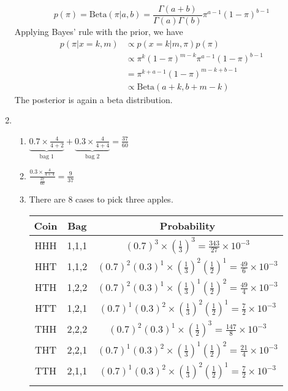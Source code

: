 \documentclass[11pt]{article}
\begin{document}
\begin{enumerate}
    \[p(\pi)=\text{Beta}(\pi|a,b)
    =\frac{\Gamma(a+b)}{\Gamma(a)\Gamma(b)}\pi^{a-1}(1-\pi)^{b-1}\]
    Applying Bayes' rule with the prior, we have
    \begin{align*}
    p(\pi|x=k,m) &\propto p(x=k|m,\pi)p(\pi) \\
    &\propto \pi^{k}(1-\pi)^{m-k}\pi^{a-1}(1-\pi)^{b-1} \\
    &= \pi^{k+a-1}(1-\pi)^{m-k+b-1} \\
    &\propto\text{Beta}(a+k,b+m-k)
    \end{align*}
    The posterior is again a beta distribution.
\item
\begin{enumerate}
    \item
    $\underbrace{0.7\times\frac{4}{4+2}}_{\text{bag }1}+
    \underbrace{0.3\times\frac{4}{4+4}}_{\text{bag }2}=\frac{37}{60}$
    \item
    $\frac{0.3\times\frac{4}{4+4}}{\frac{37}{60}}=\frac{9}{37}$
    \item
    There are 8 cases to pick three apples.
    \begin{table}[H]\centering
        \begin{tabular}{|c|c|c|}\hline
        Coin & Bag & Probability \\
        \hline\rule{0pt}{3ex}
        HHH & 1,1,1 & $(0.7)^{3}\times\left(\frac{1}{3}\right)^{3}=\frac{343}{27}\times 10^{-3}$
        \\[1ex]\hline\rule{0pt}{3ex}
        HHT & 1,1,2 & $(0.7)^{2}(0.3)^{1}\times\left(\frac{1}{3}\right)^{2}\left(\frac{1}{2}\right)^{1}=\frac{49}{6}\times 10^{-3}$ \\[1ex]\hline\rule{0pt}{3ex}
        HTH & 1,2,2 & $(0.7)^{2}(0.3)^{1}\times\left(\frac{1}{3}\right)^{1}\left(\frac{1}{2}\right)^{2}=\frac{49}{4}\times 10^{-3}$ \\[1ex]\hline\rule{0pt}{3ex}
        HTT & 1,2,1 & $(0.7)^{1}(0.3)^{2}\times\left(\frac{1}{3}\right)^{2}\left(\frac{1}{2}\right)^{1}=\frac{7}{2}\times 10^{-3}$ \\[1ex]\hline\rule{0pt}{3ex}
        THH & 2,2,2 & $(0.7)^{2}(0.3)^{1}\times\left(\frac{1}{2}\right)^{3}=\frac{147}{8}\times 10^{-3}$ \\[1ex]\hline\rule{0pt}{3ex}
        THT & 2,2,1 & $(0.7)^{1}(0.3)^{2}\times\left(\frac{1}{3}\right)^{1}\left(\frac{1}{2}\right)^{2}=\frac{21}{4}\times 10^{-3}$ \\[1ex]\hline\rule{0pt}{3ex}
        TTH & 2,1,1 & $(0.7)^{1}(0.3)^{2}\times\left(\frac{1}{3}\right)^{2}\left(\frac{1}{2}\right)^{1}=\frac{7}{2}\times 10^{-3}$ \\[1ex]\hline\rule{0pt}{3ex}

\end{tabular}
\end{table}
\end{enumerate}
\end{enumerate}
\end{document}
